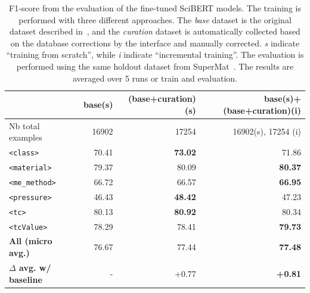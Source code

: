 \documentclass[]{interact}
\theoremstyle{plain} %
\theoremstyle{definition}
\theoremstyle{remark}
\begin{document}
\begin{table}[ht]
\centering\small
\caption{F1-score from the evaluation of the fine-tuned SciBERT models. The training is performed with three different approaches. 
The \emph{base} dataset is the original dataset described in~\cite{foppiano2021supermat}, and the \emph{curation} dataset is automatically collected based on the database corrections by the interface and manually corrected. \textit{s} indicate ``training from scratch'', while \textit{i} indicate ``incremental training''. 
The evaluation is performed using the same holdout dataset from SuperMat~\cite{foppiano2021supermat}. 
The results are averaged over 5 runs or train and evaluation. }
\begin{tabular}{lrrr}
\toprule
& \textbf{base(s)} & \textbf{(base+curation)(s)} & \textbf{base(s)+(base+curation)(i)} \\ 
\midrule
Nb total examples & 16902 & 17254 & 16902(s), 17254 (i)\\ 
\midrule
\texttt{<class>}        & 70.41         & \textbf{73.02}         & 71.86 \\ 
\texttt{<material>}     & 79.37         & 80.09         & \textbf{80.37} \\ 
\texttt{<me\_method>}   & 66.72         & 66.57         & \textbf{66.95} \\ 
\texttt{<pressure>}     & 46.43         & \textbf{48.42}         & 47.23 \\ 
\texttt{<tc>}           & 80.13         & \textbf{80.92}         & 80.34 \\ 
\texttt{<tcValue>}      & 78.29         & 78.41         & \textbf{79.73} \\ 
\midrule
\textbf{All (micro avg.)} & 76.67       & 77.44         & \textbf{77.48} \\ 
\midrule
\textbf{$\Delta$ avg. w/ baseline}& -   & +0.77     & \textbf{+0.81} \\ 
\bottomrule
\end{tabular}
\label{tab:evaluation-curation-training2}
\end{table}
\end{document}
